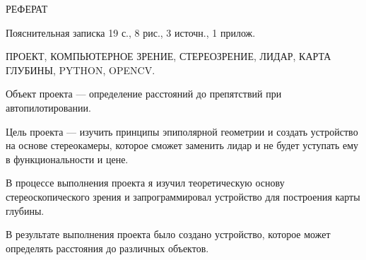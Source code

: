 \begin{center}
    РЕФЕРАТ
\end{center}

Пояснительная записка 19 с., 8 рис., 3 источн., 1 прилож.

\noindent ПРОЕКТ, КОМПЬЮТЕРНОЕ ЗРЕНИЕ, СТЕРЕОЗРЕНИЕ, ЛИДАР, КАРТА ГЛУБИНЫ, PYTHON, OPENCV.

Объект проекта — определение расстояний до препятствий при автопилотировании.

Цель проекта — изучить принципы эпиполярной геометрии и создать устройство на основе стереокамеры, которое сможет заменить лидар и не будет уступать ему в функциональности и цене.

В процессе выполнения проекта я изучил теоретическую основу стереоскопического зрения и запрограммировал устройство для построения карты глубины.

В результате выполнения проекта было создано устройство, которое может определять расстояния до различных объектов.
